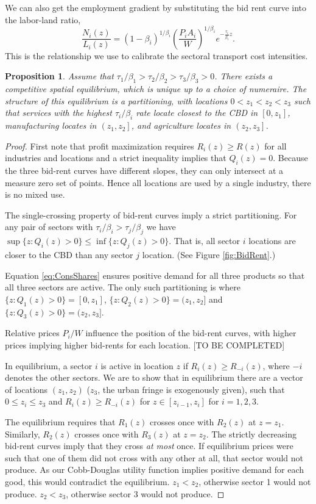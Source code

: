 \documentclass[12pt]{article}
\newtheorem{proposition}{Proposition}
\begin{document}
We can also get the employment gradient by substituting the bid rent curve into the labor-land ratio,
\begin{equation}
\label{eq:EmpGrad}
\frac{N_i(z)}{L_i(z)} = (1-\beta_i)^{1/\beta_i} \left(\frac{P_iA_i}{W}\right)^{1/\beta_i} e^{-\frac{\tau_i}{\beta_i} z}.
\end{equation}
This is the relationship we use to calibrate the sectoral transport cost intensities.

\begin{proposition}
Assume that $\tau_1/\beta_1>\tau_2/\beta_2>\tau_3/\beta_3>0$. There exists a competitive spatial equilibrium, which is unique up to a choice of numeraire. The structure of this equilibrium is a partitioning, with locations $0<z_1<z_2<z_3$ such that services with the highest $\tau_i/\beta_i$ rate locate closest to the CBD in $\left[0,z_1\right]$, manufacturing locates in $\left(z_1,z_2\right]$, and agriculture locates in $\left(z_2,z_3\right]$.
\end{proposition}
\begin{proof}
First note that profit maximization requires $R_i(z)\ge R(z)$ for all industries and locations and a strict inequality implies that $Q_i(z)=0$. Because the three bid-rent curves have different slopes, they can only intersect at a measure zero set of points. Hence all locations are used by a single industry, there is no mixed use.

The single-crossing property of bid-rent curves imply a strict partitioning. For any pair of sectors with $\tau_i/\beta_i>\tau_j/\beta_j$ we have $\sup\{z: Q_i(z)>0\} \le \inf\{z: Q_j(z)>0\}$. That is, all sector $i$ locations are closer to the CBD than any sector $j$ location. (See Figure \ref{fig:BidRent}.) 

Equation \eqref{eq:ConsShares} ensures positive demand for all three products so that all three sectors are active. The only such partitioning is where $\{z: Q_1(z)>0\} = [0,z_1]$, $\{z: Q_2(z)>0\} = (z_1,z_2]$ and $\{z: Q_3(z)>0\} = (z_2,z_3]$.

Relative prices $P_i/W$ influence the position of the bid-rent curves, with higher prices implying higher bid-rents for each location. [TO BE COMPLETED]

In equilibrium, a sector $i$ is active in location $z$ if $R_i(z)\geq R_{-i}(z)$, where $-i$ denotes the other sectors. We are to show that in equilibrium there are a vector of locations $(z_1, z_2)$ ($z_3$, the urban fringe is exogenously given), such that $0\leq z_i\leq z_3$ and $R_i(z)\geq R_{-i}(z)$ for $z\in[z_{i-1},z_i]$ for $i=1,2,3.$

The equilibrium requires that $R_1(z)$ crosses once with $R_2(z)$ at $z=z_1$. Similarly, $R_2(z)$ crosses once with $R_3(z)$ at $z=z_2$. The strictly decreasing bid-rent curves imply that they cross \emph{at most} once. If equilibrium prices were such that one of them did not cross with any other at all, that sector would not produce. As our Cobb-Douglas utility function implies positive demand for each good, this would contradict the equilibrium. $z_1<z_2$, otherwise sector 1 would not produce. $z_2<z_3$, otherwise sector 3 would not produce.
\end{proof}
\end{document}
